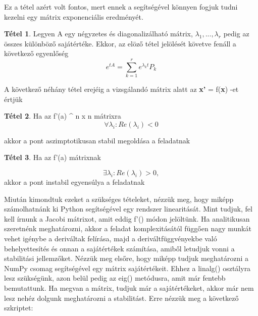 \documentclass{article}
\theoremstyle{definition}
\theoremstyle{theorem}
\newtheorem{theorem}{Tétel}
\begin{document}
Ez a tétel azért volt fontos, mert ennek a segítségével könnyen fogjuk tudni kezelni egy mátrix exponenciális eredményét.

\begin{theorem}
Legyen A egy négyzetes és diagonalizálható mátrix, $\lambda_1,...,\lambda_r$ pedig az összes különböző sajátértéke. Ekkor, az elöző tétel jelölését követve fenáll a következő egyenlőség
\begin{equation*}
    e^{tA} = \sum_{k=1}^r e^{\lambda_k t} P_k
\end{equation*}
\end{theorem}
A következő néhány tétel erejéig a vizsgálandó mátrix alatt az \textbf{x'} = f(\textbf{x}) -et értjük
\begin{theorem}
Ha az f'(a) \in {} ^ {n x n} \;\;mátrixra \;\;
\begin{equation*}
    \forall \lambda_i : Re(\lambda_i) < 0
\end{equation*}

akkor a pont aszimptotikusan stabil megoldása a feladatnak
\end{theorem}

\begin{theorem}
Ha az f'(a) mátrixnak

\begin{equation*}
    \exists \lambda_i : Re(\lambda_i) > 0,
\end{equation*}
 akkor a pont instabil egyensúlya a feladatnak
\end{theorem}

Miután kimondtuk ezeket a szükséges tételeket, nézzük meg, hogy miképp számolhatnánk ki Python segítségével egy rendszer linearitását. Mint tudjuk, fel kell írnunk a Jacobi mátrixot, amit eddig f'() módon jelöltünk. Ha analitikusan szeretnénk meghatározni, akkor a feladat komplexitásától függően nagy munkát vehet igénybe a deriváltak felírása, majd a deriváltfüggvényekbe való behelyettesítés és onnan a sajátértékek számítása, amiből letudjuk vonni a stabilitási jellemzőket. Nézzük meg elsőre, hogy miképp tudjuk meghatározni a NumPy csomag segítségével egy mátrix sajátértékeit. Ehhez a linalg() osztályra lesz szükségünk, azon belül pedig az eig() metódusra, amit már fentebb bemutattunk. Ha megvan a mátrix, tudjuk már a sajátértékeket, akkor már nem lesz nehéz dolgunk meghatározni a stabilitást. Erre nézzük meg a következő szkriptet:


\end{document}
